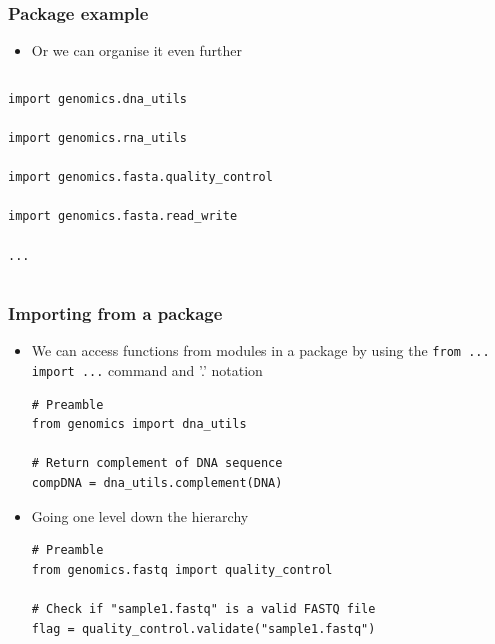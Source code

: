 \documentclass[pdf]{beamer}
\begin{document}
\begin{frame}[fragile]
\frametitle{Package example}

\begin{itemize}
	\item Or we can organise it even further
\end{itemize}


\begin{columns}


\begin{lstlisting}[style=python]
import genomics.dna_utils

import genomics.rna_utils

import genomics.fasta.quality_control

import genomics.fasta.read_write

...
\end{lstlisting}
\end{columns}

\end{frame}

\begin{frame}[fragile]
\frametitle{Importing from a package}

\begin{itemize}

\item<1-> We can access functions from modules in a package by using the  
\texttt{from ... import ...} command and '.' notation
\begin{lstlisting}[style=python]
# Preamble
from genomics import dna_utils

# Return complement of DNA sequence
compDNA = dna_utils.complement(DNA)
\end{lstlisting}

\item<2-> Going one level down the hierarchy
\begin{lstlisting}[style=python]
# Preamble
from genomics.fastq import quality_control

# Check if "sample1.fastq" is a valid FASTQ file
flag = quality_control.validate("sample1.fastq")
\end{lstlisting}

\end{itemize}

\end{frame}
\end{document}

